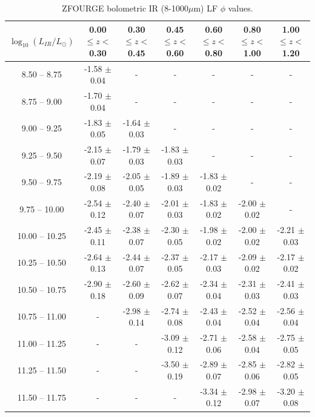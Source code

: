 \begin{landscape}
    \begin{table}
    \begin{center}
    \caption{ZFOURGE bolometric IR (8-1000$\mu$m) LF $\phi$ values.}
    \label{Tab: ZF LF}
    \begin{tabular}{@{}ccccccc@{}}
        \toprule
        $\log_{10}(L_{IR}/L_{\odot})$ & 0.00 $\leq z <$ 0.30 & 0.30 $\leq z <$ 0.45 & 0.45 $\leq z <$ 0.60 & 0.60 $\leq z <$ 0.80 & 0.80 $\leq z <$ 1.00 & 1.00 $\leq z <$ 1.20 \\
        \hline
         8.50 --  8.75 & -1.58 $\pm$ 0.04 & - & - & - & - & - \\
         8.75 --  9.00 & -1.70 $\pm$ 0.04 & - & - & - & - & - \\
         9.00 --  9.25 & -1.83 $\pm$ 0.05 & -1.64 $\pm$ 0.03 & - & - & - & - \\
         9.25 --  9.50 & -2.15 $\pm$ 0.07 & -1.79 $\pm$ 0.03 & -1.83 $\pm$ 0.03 & - & - & - \\
         9.50 --  9.75 & -2.19 $\pm$ 0.08 & -2.05 $\pm$ 0.05 & -1.89 $\pm$ 0.03 & -1.83 $\pm$ 0.02 & - & - \\
         9.75 -- 10.00 & -2.54 $\pm$ 0.12 & -2.40 $\pm$ 0.07 & -2.01 $\pm$ 0.03 & -1.83 $\pm$ 0.02 & -2.00 $\pm$ 0.02 & - \\
        10.00 -- 10.25 & -2.45 $\pm$ 0.11 & -2.38 $\pm$ 0.07 & -2.30 $\pm$ 0.05 & -1.98 $\pm$ 0.02 & -2.00 $\pm$ 0.02 & -2.21 $\pm$ 0.03 \\
        10.25 -- 10.50 & -2.64 $\pm$ 0.13 & -2.44 $\pm$ 0.07 & -2.37 $\pm$ 0.05 & -2.17 $\pm$ 0.03 & -2.09 $\pm$ 0.02 & -2.17 $\pm$ 0.02 \\
        10.50 -- 10.75 & -2.90 $\pm$ 0.18 & -2.60 $\pm$ 0.09 & -2.62 $\pm$ 0.07 & -2.34 $\pm$ 0.04 & -2.31 $\pm$ 0.03 & -2.41 $\pm$ 0.03 \\
        10.75 -- 11.00 & -                & -2.98 $\pm$ 0.14 & -2.74 $\pm$ 0.08 & -2.43 $\pm$ 0.04 & -2.52 $\pm$ 0.04 & -2.56 $\pm$ 0.04 \\
        11.00 -- 11.25 & -                & -                & -3.09 $\pm$ 0.12 & -2.71 $\pm$ 0.06 & -2.58 $\pm$ 0.04 & -2.75 $\pm$ 0.05 \\
        11.25 -- 11.50 & -                & -                & -3.50 $\pm$ 0.19 & -2.89 $\pm$ 0.07 & -2.85 $\pm$ 0.06 & -2.82 $\pm$ 0.05 \\
        11.50 -- 11.75 & -                & -                & -                & -3.34 $\pm$ 0.12 & -2.98 $\pm$ 0.07 & -3.20 $\pm$ 0.08 \\

\end{tabular}
\end{center}
\end{table}
\end{landscape}
